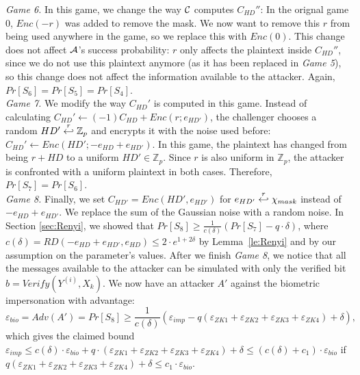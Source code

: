 \textit{Game 6.} In this game, we change the way $\mathcal{C}$ computes
$C_{HD}''$: In the orignal game 0, $Enc(-r)$ was added to remove the mask. We now
want to remove this $r$ from being used anywhere in the game, so we replace
this with $Enc(0)$. This change does not affect $\mathcal{A}$'s success
probability: $r$ only affects the plaintext inside $C_{HD}''$, since we do not
use this plaintext anymore (as it has been replaced in \textit{Game 5}), so this change
does not affect the information available to the attacker. Again, $Pr[S_6] = Pr[S_5] = Pr[S_4]$.\\
\textit{Game 7.} We modify the way $C_{HD}'$ is computed in this game. Instead
of calculating $C_{HD}' \gets (-1)C_{HD} + Enc(r;e_{HD'})$, the challenger chooses a
random $HD' \stackrel{r}{\hookleftarrow} \mathbb{Z}_p$ and encrypts it with the noise used
before: $C_{HD}' \gets Enc(HD'; -e_{HD} + e_{HD'})$. In this game, the
plaintext has changed from being $r + HD$ to a uniform $HD' \in \mathbb{Z}_p$.
Since $r$ is also uniform in $\mathbb{Z}_p$, the attacker is confronted with a uniform
plaintext in both cases. Therefore, $Pr[S_7] = Pr[S_6]$.\\
\textit{Game 8.} Finally, we set $C_{HD'} = Enc(HD', e_{HD'})$ for $e_{HD'}
\stackrel{r}{\hookleftarrow} \chi_{mask}$ instead of $-e_{HD} + e_{HD'}$. We replace the sum
of the Gaussian noise with a random noise. In Section \ref{sec:Renyi}, we
showed that $Pr[S_8] \geq \frac{1}{c(\delta)}(Pr[S_7]-q \cdot \delta)$, where $c(\delta) = RD(-e_{HD} + e_{HD'},
e_{HD}) \leq 2 \cdot e^{1+2\delta}$ by Lemma~\ref{le:Renyi} and by our assumption on the parameter's values. After we finish \textit{Game 8}, we notice that all the messages available to the attacker can be simulated with only the verified bit $b =
Verify(Y^{(i)}, X_k)$. We now have an attacker $A'$ against the biometric
impersonation with advantage:
\[
\varepsilon_{bio} = Adv(A') = Pr[S_8] \geq \frac{1}{c(\delta)}(\varepsilon_{imp} - q(\varepsilon_{ZK1}+\varepsilon_{ZK2} +
\varepsilon_{ZK3} + \varepsilon_{ZK4}) + \delta),
\]
which gives the claimed bound $\varepsilon_{imp} \leq c(\delta) \cdot \varepsilon_{bio} + q \cdot (\varepsilon_{ZK1}+\varepsilon_{ZK2} +
\varepsilon_{ZK3} + \varepsilon_{ZK4}) + \delta \leq (c(\delta)+c_1) \cdot \varepsilon_{bio}$ if $q(\varepsilon_{ZK1}+\varepsilon_{ZK2} +
\varepsilon_{ZK3} + \varepsilon_{ZK4}) + \delta \leq c_1 \cdot \varepsilon_{bio}$.


